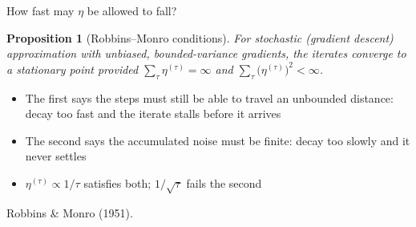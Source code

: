\documentclass[aspectratio=169, 11pt]{beamer}
\newtheorem{propx}[theorem]{Proposition}
\newcommand{\srcline}[1]{%
  \par\vspace{0.25em}%
  {\scriptsize\color{mcMuted}\hfill #1\par}}
\newcommand{\src}[3]{}      %
\begin{document}
\begin{frame}{How fast may $\eta$ be allowed to fall?}
  \src{robbins1951}{equation}{6}
  \src{robbins1951}{equation}{26}
  \src{robbins1951}{section}{3}
  \vspace{-0.35em}
  \begin{propx}[Robbins--Monro conditions]\label{th:rm}
    \small
    For stochastic (gradient descent) approximation with unbiased, bounded-variance
    gradients, the iterates converge to a stationary point provided
    $\sum_{\tau} \eta^{(\tau)} = \infty$ and
    $\sum_{\tau} \big(\eta^{(\tau)}\big)^{2} < \infty$.
  \end{propx}
  \vspace{0.3em}
  \begin{itemize}\itemsep0.3em
    \item The first says the steps must still be able to travel an
          unbounded distance: decay too fast and the iterate stalls
          before it arrives
    \item The second says the accumulated noise must be finite: decay
          too slowly and it never settles
    \item $\eta^{(\tau)} \propto 1/\tau$ satisfies both;
          $1/\sqrt{\tau}$ fails the second
  \end{itemize}
  \srcline{Robbins \& Monro (1951).}
\end{frame}
\end{document}
